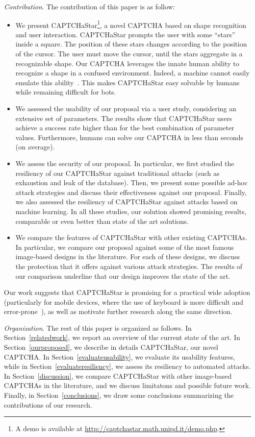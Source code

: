 \documentclass[conference]{IEEEtran}
\begin{document}
\noindent
\textit{Contribution}. The contribution of this paper is as follow:
\begin{itemize}
\item We present CAPTCHaStar\footnote{A demo is available at \url{http://captchastar.math.unipd.it/demo.php}.}, a novel CAPTCHA based on shape recognition and user interaction. 
CAPTCHaStar prompts the user with some ``stars'' inside a square. 
  The position of these stars changes according to the position of the cursor. The user must move the cursor, until the stars aggregate in a recognizable shape. Our CAPTCHA leverages the innate human ability to recognize a shape in a confused environment. Indeed, a machine cannot easily emulate this ability~\cite{hinton2007recognize}.
  This makes CAPTCHaStar easy solvable by humans while remaining difficult for bots. \item We assessed the usability of our proposal via a user study, considering an extensive set of parameters.
The results show that CAPTCHaStar users achieve a success rate higher than  for the best combination of parameter values. Furthermore, humans can solve our CAPTCHA in less than  seconds (on average).
\item
  We assess the security of our proposal.
  In particular, we first studied the resiliency of our CAPTCHaStar against traditional attacks (such as exhaustion and leak of the database). 
Then, we present some possible ad-hoc attack strategies and discuss their effectiveness against our proposal.
  Finally, we also assessed the resiliency of CAPTCHaStar against attacks based on machine learning.
  In all these studies, our solution showed promising results, comparable or even better than state of the art solutions.
\item We compare the features of CAPTCHaStar with other existing CAPTCHAs.
  In particular, we compare our proposal against some
of the most famous image-based designs in the literature.
  For each of these designs, we discuss the protection that it offers against various attack strategies. The results of our comparison underline that our design improves the state of the art.
\end{itemize}
Our work suggests that CAPTCHaStar is promising for a practical wide adoption (particularly for mobile devices, where the use of keyboard is more difficult and error-prone~\cite{reynaga2013usability}), as well as motivate further research along the same direction.

\noindent
\textit{Organization}. The rest of this paper is organized as follows.
In Section~\ref{relatedwork}, we report an overview of the current state of the art.
In Section~\ref{ourproposed}, we describe in details CAPTCHaStar, our novel CAPTCHA.
In Section~\ref{evaluateusability}, we evaluate its usability features, while in Section~\ref{evaluateresiliency}, we assess its resiliency to automated attacks.
In Section~\ref{discussion}, we compare CAPTCHaStar with other image-based CAPTCHAs in the literature, and we discuss limitatons and possible future work.
Finally, in Section~\ref{conclusions}, we draw some conclusions summarizing the contributions of our research.
\end{document}
